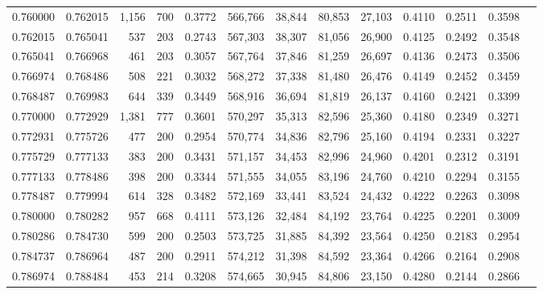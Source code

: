\begin{tabular}{rrrrrrrrrrrrr}
0.760000 & 0.762015 & 1,156 & 700 &                                     0.3772 & 566,766 &  38,844 &  80,853 &  27,103 & 0.4110 & 0.2511 & 0.3598 \\
0.762015 & 0.765041 &   537 & 203 &                                     0.2743 & 567,303 &  38,307 &  81,056 &  26,900 & 0.4125 & 0.2492 & 0.3548 \\
0.765041 & 0.766968 &   461 & 203 &                                     0.3057 & 567,764 &  37,846 &  81,259 &  26,697 & 0.4136 & 0.2473 & 0.3506 \\
0.766974 & 0.768486 &   508 & 221 &                                     0.3032 & 568,272 &  37,338 &  81,480 &  26,476 & 0.4149 & 0.2452 & 0.3459 \\
0.768487 & 0.769983 &   644 & 339 &                                     0.3449 & 568,916 &  36,694 &  81,819 &  26,137 & 0.4160 & 0.2421 & 0.3399 \\
0.770000 & 0.772929 & 1,381 & 777 &                                     0.3601 & 570,297 &  35,313 &  82,596 &  25,360 & 0.4180 & 0.2349 & 0.3271 \\
0.772931 & 0.775726 &   477 & 200 &                                     0.2954 & 570,774 &  34,836 &  82,796 &  25,160 & 0.4194 & 0.2331 & 0.3227 \\
0.775729 & 0.777133 &   383 & 200 &                                     0.3431 & 571,157 &  34,453 &  82,996 &  24,960 & 0.4201 & 0.2312 & 0.3191 \\
0.777133 & 0.778486 &   398 & 200 &                                     0.3344 & 571,555 &  34,055 &  83,196 &  24,760 & 0.4210 & 0.2294 & 0.3155 \\
0.778487 & 0.779994 &   614 & 328 &                                     0.3482 & 572,169 &  33,441 &  83,524 &  24,432 & 0.4222 & 0.2263 & 0.3098 \\
0.780000 & 0.780282 &   957 & 668 &                                     0.4111 & 573,126 &  32,484 &  84,192 &  23,764 & 0.4225 & 0.2201 & 0.3009 \\
0.780286 & 0.784730 &   599 & 200 &                                     0.2503 & 573,725 &  31,885 &  84,392 &  23,564 & 0.4250 & 0.2183 & 0.2954 \\
0.784737 & 0.786964 &   487 & 200 &                                     0.2911 & 574,212 &  31,398 &  84,592 &  23,364 & 0.4266 & 0.2164 & 0.2908 \\
0.786974 & 0.788484 &   453 & 214 &                                     0.3208 & 574,665 &  30,945 &  84,806 &  23,150 & 0.4280 & 0.2144 & 0.2866 \\

\end{tabular}
